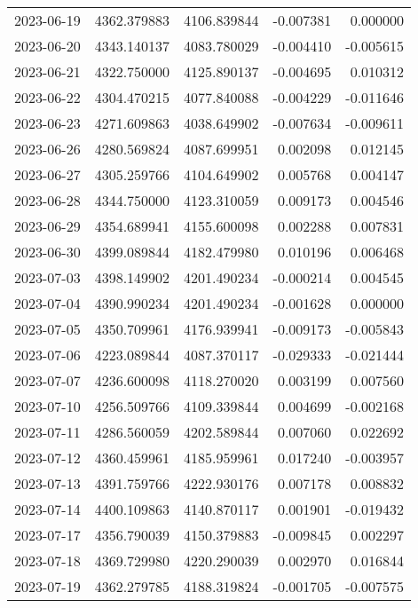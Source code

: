 \begin{tabular}{lrrrr}
2023-06-19 & 4362.379883 & 4106.839844 &       -0.007381 &     0.000000 \\
2023-06-20 & 4343.140137 & 4083.780029 &       -0.004410 &    -0.005615 \\
2023-06-21 & 4322.750000 & 4125.890137 &       -0.004695 &     0.010312 \\
2023-06-22 & 4304.470215 & 4077.840088 &       -0.004229 &    -0.011646 \\
2023-06-23 & 4271.609863 & 4038.649902 &       -0.007634 &    -0.009611 \\
2023-06-26 & 4280.569824 & 4087.699951 &        0.002098 &     0.012145 \\
2023-06-27 & 4305.259766 & 4104.649902 &        0.005768 &     0.004147 \\
2023-06-28 & 4344.750000 & 4123.310059 &        0.009173 &     0.004546 \\
2023-06-29 & 4354.689941 & 4155.600098 &        0.002288 &     0.007831 \\
2023-06-30 & 4399.089844 & 4182.479980 &        0.010196 &     0.006468 \\
2023-07-03 & 4398.149902 & 4201.490234 &       -0.000214 &     0.004545 \\
2023-07-04 & 4390.990234 & 4201.490234 &       -0.001628 &     0.000000 \\
2023-07-05 & 4350.709961 & 4176.939941 &       -0.009173 &    -0.005843 \\
2023-07-06 & 4223.089844 & 4087.370117 &       -0.029333 &    -0.021444 \\
2023-07-07 & 4236.600098 & 4118.270020 &        0.003199 &     0.007560 \\
2023-07-10 & 4256.509766 & 4109.339844 &        0.004699 &    -0.002168 \\
2023-07-11 & 4286.560059 & 4202.589844 &        0.007060 &     0.022692 \\
2023-07-12 & 4360.459961 & 4185.959961 &        0.017240 &    -0.003957 \\
2023-07-13 & 4391.759766 & 4222.930176 &        0.007178 &     0.008832 \\
2023-07-14 & 4400.109863 & 4140.870117 &        0.001901 &    -0.019432 \\
2023-07-17 & 4356.790039 & 4150.379883 &       -0.009845 &     0.002297 \\
2023-07-18 & 4369.729980 & 4220.290039 &        0.002970 &     0.016844 \\
2023-07-19 & 4362.279785 & 4188.319824 &       -0.001705 &    -0.007575 \\

\end{tabular}
